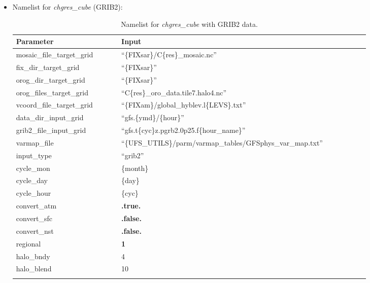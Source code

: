 \documentclass[11pt,fleqn]{report}              %
\begin{document}
\begin{itemize}

\item Namelist for {\it chgres\_cube} (GRIB2):
{
\fontsize{9}{11}\selectfont
\begin{longtable}{ p{0.25\linewidth} | p{0.59\linewidth} }
\hline
\hline
 Parameter & Input \\
\hline
 mosaic\_file\_target\_grid  & ``\{FIXsar\}/C\{res\}\_mosaic.nc''  \\
 fix\_dir\_target\_grid & ``\{FIXsar\}'' \\
 orog\_dir\_target\_grid & ``\{FIXsar\}'' \\
 orog\_files\_target\_grid & ``C\{res\}\_oro\_data.tile7.halo4.nc'' \\
 vcoord\_file\_target\_grid & ``\{FIXam\}/global\_hyblev.l\{LEVS\}.txt'' \\
 data\_dir\_input\_grid & ``gfs.\{ymd\}/\{hour\}''\\
 grib2\_file\_input\_grid & ``gfs.t\{cyc\}z.pgrb2.0p25.f\{hour\_name\}'' \\
 varmap\_file & ``\{UFS\_UTILS\}/parm/varmap\_tables/GFSphys\_var\_map.txt'' \\
 input\_type & ``grib2'' \\
 cycle\_mon & \{month\} \\
 cycle\_day &\{day\}  \\
 cycle\_hour & \{cyc\} \\
 convert\_atm & {\bf .true.} \\
 convert\_sfc & {\bf .false.} \\
 convert\_nst & {\bf .false. } \\
 regional & {\bf 1} \\
 halo\_bndy & 4 \\
 halo\_blend & 10 \\
\hline
\caption{Namelist for {\it chgres\_cube} with GRIB2 data.}
\label{table:namelist_ic_chgres_grib2}
\end{longtable}
}



\end{itemize}
\end{document}
